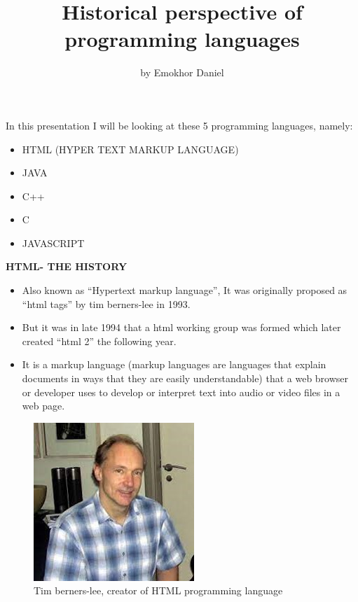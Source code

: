 \documentclass{article}
\title{Historical perspective of programming languages}
\author{by Emokhor Daniel}
\begin{document}
	\maketitle
	\newpage
	In this presentation I will be looking at these 5 programming languages, namely:
	\begin{itemize}
		\item HTML (HYPER TEXT MARKUP LANGUAGE)
		\item JAVA
		\item C++
		\item C
		\item JAVASCRIPT
	\end{itemize}
    \newpage
    \maketitle \textbf{ HTML- THE HISTORY}
    \begin{itemize}
        \item Also known as “Hypertext markup language”, It was originally proposed as “html tags” by tim berners-lee in 1993.
        \item But it was in late 1994 that a html working group was formed which later created “html 2” the following year. 
        \item It is a markup language (markup languages are languages that explain documents in ways that they are easily understandable) that a web browser or developer uses to develop or interpret text into audio or video files in a web page.
   \end{itemize}
\newpage
\begin{figure}
	\includegraphics[width=\linewidth]{Picture1}
	\caption{Tim berners-lee, creator of HTML programming language}
\end{figure}
\end{document}
